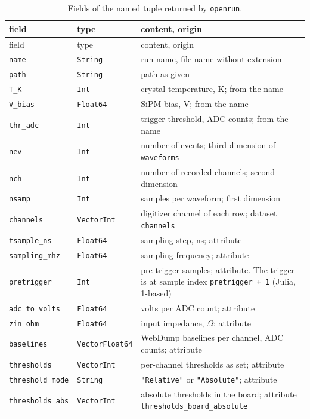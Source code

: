 \documentclass[11pt]{article}
\newcommand{\code}[1]{\texttt{#1}}
\begin{document}
\begin{longtable}{l l p{78mm}}
\caption{Fields of the named tuple returned by \code{openrun}.}\label{tab:run}\\
\toprule
field & type & content, origin \\
\midrule
\endfirsthead
\toprule
field & type & content, origin \\
\midrule
\endhead
\code{name}   & \code{String} & run name, file name without extension \\
\code{path}   & \code{String} & path as given \\
\code{T\_K}   & \code{Int}     & crystal temperature, K; from the name \\
\code{V\_bias} & \code{Float64} & SiPM bias, V; from the name \\
\code{thr\_adc} & \code{Int}   & trigger threshold, ADC counts; from the name \\
\code{nev}    & \code{Int} & number of events; third dimension of \code{waveforms} \\
\code{nch}    & \code{Int} & number of recorded channels; second dimension \\
\code{nsamp}  & \code{Int} & samples per waveform; first dimension \\
\code{channels} & \code{Vector{Int}} & digitizer channel of each row; dataset \code{channels} \\
\code{tsample\_ns} & \code{Float64} & sampling step, ns; attribute \\
\code{sampling\_mhz} & \code{Float64} & sampling frequency; attribute \\
\code{pretrigger} & \code{Int} & pre-trigger samples; attribute. The trigger is at sample index \code{pretrigger + 1} (Julia, 1-based) \\
\code{adc\_to\_volts} & \code{Float64} & volts per ADC count; attribute \\
\code{zin\_ohm} & \code{Float64} & input impedance, $\Omega$; attribute \\
\code{baselines} & \code{Vector{Float64}} & WebDump baselines per channel, ADC counts; attribute \\
\code{thresholds} & \code{Vector{Int}} & per-channel thresholds as set; attribute \\
\code{threshold\_mode} & \code{String} & \code{"Relative"} or \code{"Absolute"}; attribute \\
\code{thresholds\_abs} & \code{Vector{Int}} & absolute thresholds in the board; attribute \code{thresholds\_board\_absolute} \\

\end{longtable}
\end{document}
